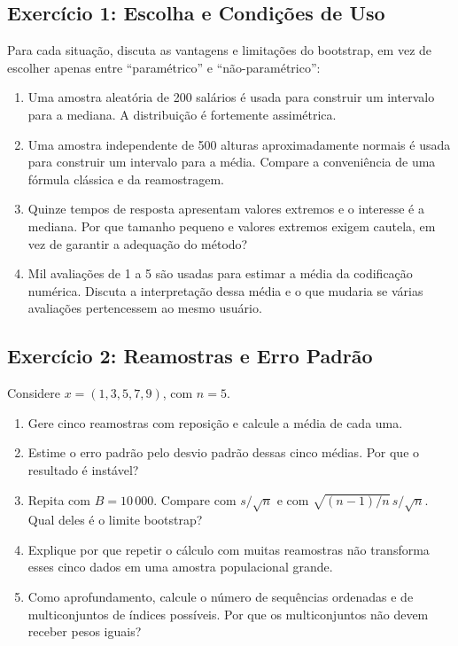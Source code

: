 \documentclass[12pt,a4paper]{article}
\begin{document}
\subsection*{Exercício 1: Escolha e Condições de Uso}
Para cada situação, discuta as vantagens e limitações do bootstrap, em vez de escolher apenas entre ``paramétrico'' e ``não-paramétrico'':
\begin{enumerate}[label=(\alph*)]
\item Uma amostra aleatória de 200 salários é usada para construir um intervalo para a mediana. A distribuição é fortemente assimétrica.
\item Uma amostra independente de 500 alturas aproximadamente normais é usada para construir um intervalo para a média. Compare a conveniência de uma fórmula clássica e da reamostragem.
\item Quinze tempos de resposta apresentam valores extremos e o interesse é a mediana. Por que tamanho pequeno e valores extremos exigem cautela, em vez de garantir a adequação do método?
\item Mil avaliações de 1 a 5 são usadas para estimar a média da codificação numérica. Discuta a interpretação dessa média e o que mudaria se várias avaliações pertencessem ao mesmo usuário.
\end{enumerate}

\subsection*{Exercício 2: Reamostras e Erro Padrão}
Considere $x=(1,3,5,7,9)$, com $n=5$.
\begin{enumerate}[label=(\alph*)]
\item Gere cinco reamostras com reposição e calcule a média de cada uma.
\item Estime o erro padrão pelo desvio padrão dessas cinco médias. Por que o resultado é instável?
\item Repita com $B=10\,000$. Compare com $s/\sqrt n$ e com $\sqrt{(n-1)/n}\,s/\sqrt n$. Qual deles é o limite bootstrap?
\item Explique por que repetir o cálculo com muitas reamostras não transforma esses cinco dados em uma amostra populacional grande.
\item Como aprofundamento, calcule o número de sequências ordenadas e de multiconjuntos de índices possíveis. Por que os multiconjuntos não devem receber pesos iguais?
\end{enumerate}
\end{document}
